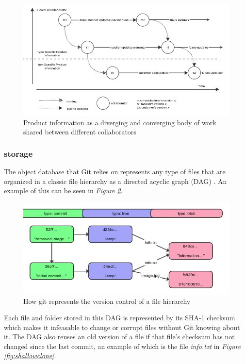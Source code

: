 \documentclass[12pt,a4paper]{article}
\begin{document}
\begin{figure}[!ht]
    \centering
    \includegraphics[scale=0.4]{images/workflow2.png}
    \caption{Product information as a diverging and converging body of work shared between different collaborators }
    \label{fig:workflow}
\end{figure}



\subsubsection{storage}
The object database that Git relies on represents any type of files that are organized in a classic file hierarchy as a directed acyclic graph (DAG) \citep{progit}. An example of this can be seen in \emph{Figure \ref{fig:storage}}.

\begin{figure}[!ht]
    \centering
    \includegraphics[scale=0.5]{images/storage.png}
    \caption{How git represents the version control of a file hierarchy}
    \label{fig:storage}
\end{figure}

Each file and folder stored in this DAG is represented by its SHA-1 checksum which makes it infeasable to change or corrupt files without Git knowing about it. The DAG also reuses an old version of a file if that file's checksum has not changed since the last commit, an example of which is the file \emph{info.txt} in \emph{Figure \ref{fig:shallowclone}}.
\end{document}
